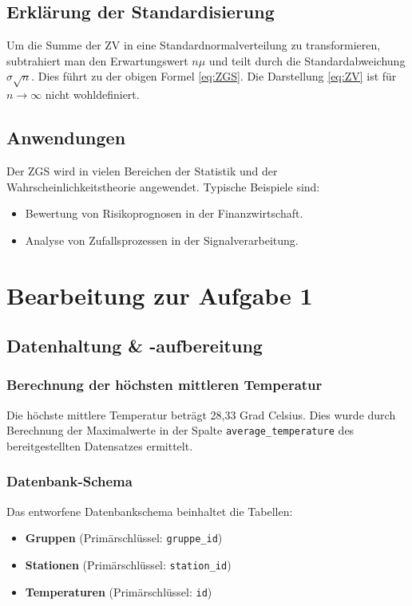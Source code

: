 \documentclass{article}
\begin{document}
\subsection{Erklärung der Standardisierung}

Um die Summe der ZV in eine Standardnormalverteilung zu transformieren, subtrahiert man den Erwartungswert $n\mu$ und teilt durch die Standardabweichung $\sigma \sqrt{n}$. Dies führt zu der obigen Formel \eqref{eq:ZGS}. Die Darstellung \eqref{eq:ZV} ist für $n \rightarrow \infty$ nicht wohldefiniert.
\subsection{Anwendungen}
Der ZGS wird in vielen Bereichen der Statistik und der Wahrscheinlichkeitstheorie angewendet. Typische Beispiele sind:
\begin{itemize}
    \item Bewertung von Risikoprognosen in der Finanzwirtschaft.
    \item Analyse von Zufallsprozessen in der Signalverarbeitung.
\end{itemize}

\newpage

\section{Bearbeitung zur Aufgabe 1}
\subsection{Datenhaltung \& -aufbereitung}
\subsubsection{Berechnung der höchsten mittleren Temperatur}
Die höchste mittlere Temperatur beträgt 28,33 Grad Celsius. Dies wurde durch Berechnung der Maximalwerte in der Spalte \texttt{average\_temperature} des bereitgestellten Datensatzes ermittelt.

\subsubsection{Datenbank-Schema}
Das entworfene Datenbankschema beinhaltet die Tabellen:
\begin{itemize}
    \item \textbf{Gruppen} (Primärschlüssel: \texttt{gruppe\_id})
    \item \textbf{Stationen} (Primärschlüssel: \texttt{station\_id})
    \item \textbf{Temperaturen} (Primärschlüssel: \texttt{id})
\end{itemize}
\end{document}
